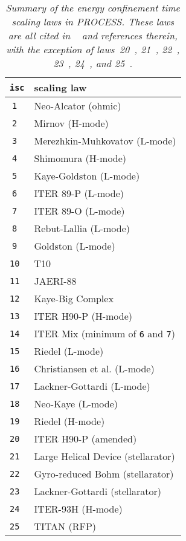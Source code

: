 \documentclass[11pt,a4paper]{report}
\makeatletter
\newcommand{\PSD}{\mbox{\it PROCESS}\@.\/ }
\makeatother
\begin{document}
\begin{table}[ht]
\begin{center}

\begin{tabular}{||c||l||} \hline
{\tt isc} & scaling law \\ \hline
\tt 1  & \rm Neo-Alcator (ohmic) \\
\tt 2  & \rm Mirnov (H-mode) \\
\tt 3  & \rm Merezhkin-Muhkovatov (L-mode) \\
\tt 4  & \rm Shimomura (H-mode) \\
\tt 5  & \rm Kaye-Goldston (L-mode) \\
\tt 6  & \rm ITER 89-P (L-mode) \\
\tt 7  & \rm ITER 89-O (L-mode) \\
\tt 8  & \rm Rebut-Lallia (L-mode) \\
\tt 9  & \rm Goldston (L-mode) \\
\tt 10 & \rm T10 \\
\tt 11 & \rm JAERI-88 \\
\tt 12 & \rm Kaye-Big Complex \\
\tt 13 & \rm ITER H90-P (H-mode) \\
\tt 14 & \rm ITER Mix (minimum of {\tt 6} and {\tt 7}) \\
\tt 15 & \rm Riedel (L-mode) \\
\tt 16 & \rm Christiansen et al. (L-mode) \\
\tt 17 & \rm Lackner-Gottardi (L-mode) \\
\tt 18 & \rm Neo-Kaye (L-mode) \\
\tt 19 & \rm Riedel (H-mode) \\
\tt 20 & \rm ITER H90-P (amended) \\
\tt 21 & \rm Large Helical Device (stellarator) \\
\tt 22 & \rm Gyro-reduced Bohm (stellarator) \\
\tt 23 & \rm Lackner-Gottardi (stellarator) \\
\tt 24 & \rm ITER-93H (H-mode) \\
\tt 25 & \rm TITAN (RFP) \\ \hline
\end{tabular}
\end{center}
\caption[TABLE_TAU]{{\it
Summary of the energy confinement time scaling laws in \PSD These laws are all
cited in ~\cite{172,IPDG} and references therein, with the exception of
laws~20~\cite{H90P}, 21~\cite{LHD}, 22~\cite{GRB}, 23~\cite{LG}, 
24~\cite{iter93h}, and 25~\cite{titan1}. }}
\label{tab:scaling_laws}
\end{table}
\end{document}
